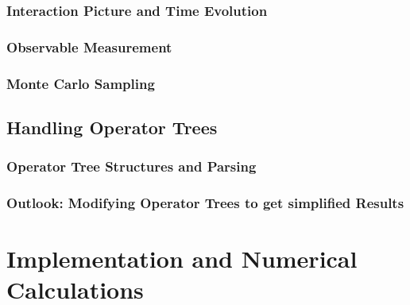 \documentclass[
headings=optiontohead,              %
12pt,                               %
DIV=13,                             %
twoside=false,                      %
open=right,                         %
BCOR=00mm,                          %
toc=bibliographynumbered            %
]{scrreport}
\begin{document}
        \subsection{Interaction Picture and Time Evolution}
        \label{sec:theory-interaction-picture}
        
        \FloatBarrier

        \subsection{Observable Measurement}
        \label{sec:theory-observables}
        
        \FloatBarrier

        \subsection{Monte Carlo Sampling}
        \label{sec:theory-monte-carlo}
        
        \FloatBarrier

    \section{Handling Operator Trees}
    \label{sec:theory-parsing-linting}
    
    \FloatBarrier

        \subsection{Operator Tree Structures and Parsing}
        \label{sec:theory-operator-trees}
        
        \FloatBarrier

        \subsection{Outlook: Modifying Operator Trees to get \glqq simplified\grqq{} Results}
        \label{sec:theory-operator-tree-simplification}
        
        \FloatBarrier

\chapter{Implementation and Numerical Calculations}
\label{sec:implementation-and-numerical}

\FloatBarrier
\end{document}
